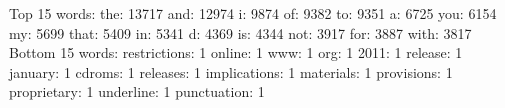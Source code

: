 Top 15 words:
the: 13717
and: 12974
i: 9874
of: 9382
to: 9351
a: 6725
you: 6154
my: 5699
that: 5409
in: 5341
d: 4369
is: 4344
not: 3917
for: 3887
with: 3817
Bottom 15 words:
restrictions: 1
online: 1
www: 1
org: 1
2011: 1
release: 1
january: 1
cdroms: 1
releases: 1
implications: 1
materials: 1
provisions: 1
proprietary: 1
underline: 1
punctuation: 1
